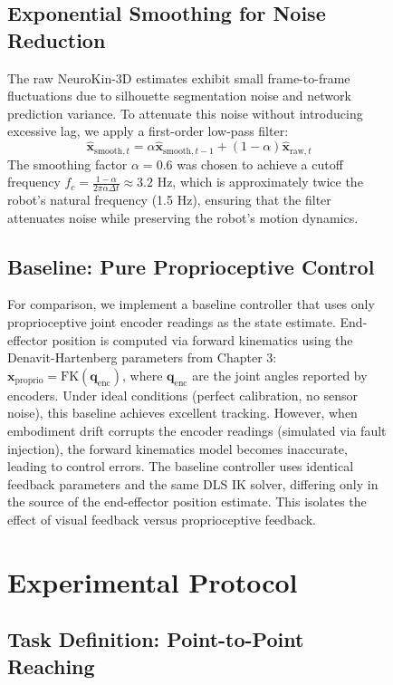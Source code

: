 \documentclass[12pt,a4paper,oneside]{report}
\begin{document}
\begin{figure}[H]
\subsection{Exponential Smoothing for Noise Reduction}

The raw NeuroKin-3D estimates exhibit small frame-to-frame fluctuations due to silhouette segmentation noise and network prediction variance. To attenuate this noise without introducing excessive lag, we apply a first-order low-pass filter:
\begin{equation}
\hat{\mathbf{x}}_{\text{smooth},t} = \alpha \hat{\mathbf{x}}_{\text{smooth},t-1} + (1 - \alpha) \hat{\mathbf{x}}_{\text{raw},t}
\end{equation}
The smoothing factor $\alpha = 0.6$ was chosen to achieve a cutoff frequency $f_c = \frac{1-\alpha}{2\pi \alpha \Delta t} \approx 3.2$ Hz, which is approximately twice the robot's natural frequency (1.5 Hz), ensuring that the filter attenuates noise while preserving the robot's motion dynamics.

\subsection{Baseline: Pure Proprioceptive Control}

For comparison, we implement a baseline controller that uses only proprioceptive joint encoder readings as the state estimate. End-effector position is computed via forward kinematics using the Denavit-Hartenberg parameters from Chapter 3: $\mathbf{x}_{\text{proprio}} = \text{FK}(\mathbf{q}_{\text{enc}})$, where $\mathbf{q}_{\text{enc}}$ are the joint angles reported by encoders. Under ideal conditions (perfect calibration, no sensor noise), this baseline achieves excellent tracking. However, when embodiment drift corrupts the encoder readings (simulated via fault injection), the forward kinematics model becomes inaccurate, leading to control errors. The baseline controller uses identical feedback parameters and the same DLS IK solver, differing only in the source of the end-effector position estimate. This isolates the effect of visual feedback versus proprioceptive feedback.

\section{Experimental Protocol}

\subsection{Task Definition: Point-to-Point Reaching}


\end{figure}
\end{document}
